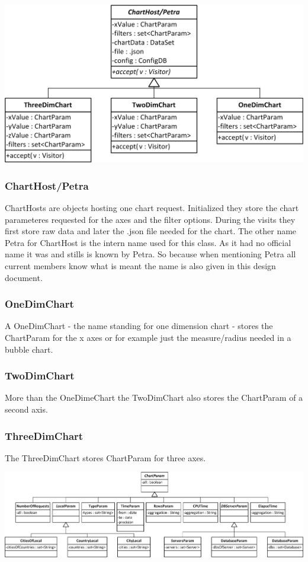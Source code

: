 \begin{center}
\includegraphics{Pictures/Parts/Petra.png}
\end{center}  

\subsubsection*{ChartHost/Petra}
ChartHosts are objects hosting one chart request. Initialized they store the chart parameteres requested for
the axes and the filter options. During the visits they first store raw data and later the .json file needed
for the chart.
The other name Petra for ChartHost is the intern name used for this class. As it had no official name it was
and stills is known by Petra. So because when mentioning Petra all current members know what is meant the name
is also given in this design document.

\subsubsection*{OneDimChart}
A OneDimChart - the name standing for one dimension chart - stores the ChartParam for the x axes or for example
just the measure/radius needed in a bubble chart.
 
 
\subsubsection*{TwoDimChart}
More than the OneDimeChart the TwoDimChart also stores the ChartParam of a second axis.

\subsubsection*{ThreeDimChart} 
The ThreeDimChart stores ChartParam for three axes.

\begin{center}
\includegraphics[width=1\linewidth]{Pictures/Parts/ChartPara.png}
\end{center}  

